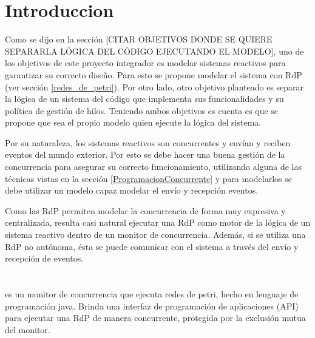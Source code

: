 \section{Introduccion}

Como se dijo en la sección [{\color{red}CITAR OBJETIVOS DONDE SE QUIERE
SEPARARLA LÓGICA DEL CÓDIGO EJECUTANDO EL MODELO}], uno de los objetivos de este proyecto integrador es
{\color{blue} modelar sistemas reactivos para garantizar su correcto
diseño}.
Para esto se propone modelar el sistema con RdP (ver sección \ref{redes_de_petri}).
Por otro lado, otro objetivo planteado es {\color{blue} separar la lógica de un
sistema del código que implementa sus funcionalidades y su política de gestión
de hilos}.
Teniendo ambos objetivos es cuenta es que se propone que sea el propio modelo
quien ejecute la lógica del sistema.

Por su naturaleza, los sistemas reactivos son concurrentes y envían y reciben
eventos del mundo exterior.
Por esto se debe hacer una buena gestión de la concurrencia para asegurar su correcto
funcionamiento, utilizando alguna de las técnicas vistas en
la sección \ref{ProgramacionConcurrente} y para modelarlos se debe utilizar un
modelo capaz modelar el envío y recepción eventos.

Como las RdP permiten modelar la concurrencia de forma muy expresiva y
centralizada, resulta casi natural ejecutar una RdP como motor de la lógica de
un sistema reactivo dentro de un monitor de concurrencia. Además, si se utiliza
una RdP no autónoma, ésta se puede comunicar con el sistema a través del envío y
recepción de eventos.

\section{\javapetriconcurrencymonitor}

\javapetriconcurrencymonitor es un monitor de concurrencia que ejecuta redes
de petri, hecho en lenguaje de programación java.
Brinda una interfaz de programación de aplicaciones (API) para ejecutar una RdP
de manera concurrente, protegida por la exclusión mutua del monitor.

